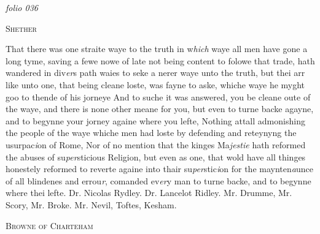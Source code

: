 \documentclass[12pt, a4paper]{book}
\begin{document}
\textit{folio 036}


            
            	
				\begin{center} \begin{large} {\scshape Shether} \end{large} \end{center}
			

            	
            		
				\marginpar[\vspace{0.5cm}{\textcolor{Gray}{Seditious}}]{}
			
            		
				\marginpar[\vspace{0.5cm}{\textcolor{Gray}{n}}]{}
			
            		
		\ifthenelse{\isodd{\thepage}}
		{\reversemarginpar}
		{\normalmarginpar}
		That there was one straite waye to the truth in w\textit{hich} waye
 all men have gone a long tyme, saving a fewe nowe of late
 not being content to folowe that trade, hath wandered in div\textit{er}s
 path waies to seke a nerer waye unto the truth, but
 thei arr like unto one, that being cleane loste, was fayne
 to aske, whiche waye he myght goo to thende of his jorneye
 And to suche it was answered, you be cleane oute of the
 waye, and there is none other meane for you, but even to
 turne backe agayne, and to begynne your jorney againe
 where you lefte, Nothing attall admonishing the people of
 the waye whiche men had loste by defending and reteynyng
 the usurpac\textit{i}on of Rome, Nor of no mention that the kinges
 Ma\textit{jestie} hath reformed the abuses of su\textit{per}sticious Religion, but
 even as one, that wold have all thinges honestely reformed
 to reverte againe into thair su\textit{per}stic\textit{i}on for the maynten\textit{a}unce
 of all blindenes and errou\textit{r}, comanded ev\textit{er}y man to turne
            			backe, and to begynne where thei lefte. Dr. Nicolas Rydley.
            			Dr. Lancelot Ridley. Mr. Drumme, Mr. Scory, Mr. Broke. Mr.
            				Nevil, Toftes, Kesham.


            
               
				\begin{center} \begin{large} {\scshape Browne of Charteham} \end{large} \end{center}
			
            	
			
				\marginpar[\vspace{0.5cm}{\textcolor{Gray}{n}}]{}
			
\end{document}
